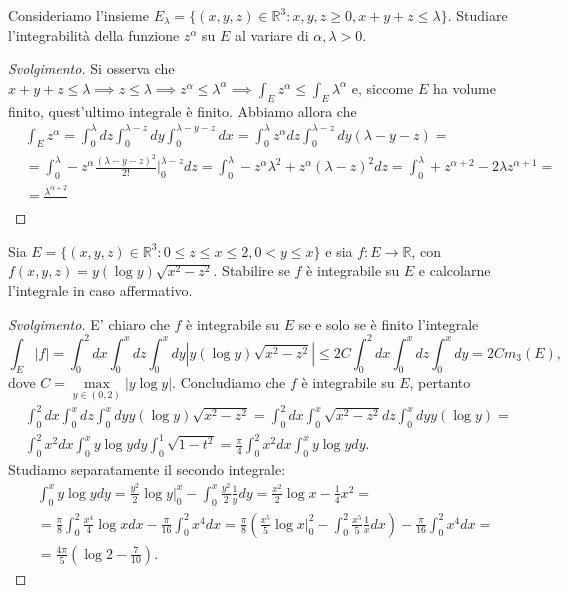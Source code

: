 \begin{exercise}
	Consideriamo l'insieme $E_\lambda = \{ (x, y, z) \in \mathbb{R}^3 : x, y, z \geq 0, x + y + z \leq \lambda \}$. Studiare l'integrabilità della funzione $z^{\alpha}$ su $E$ al variare di $\alpha, \lambda > 0$.
\end{exercise}
\begin{proof}[Svolgimento]
	Si osserva che $x + y + z \leq \lambda \implies z \leq \lambda \implies z^{\alpha} \leq \lambda^{\alpha} \implies \int_E z^{\alpha} \leq \int_E \lambda^{\alpha}$ e, siccome $E$ ha volume finito, quest'ultimo integrale è finito. Abbiamo allora che
	\begin{align*}
		&\int_E z^{\alpha} = \int_0^{\lambda} dz \int_0^{\lambda - z} dy \int_0^{\lambda - y - z} dx = \int_0^{\lambda} z^{\alpha} dz \int_0^{\lambda - z} dy (\lambda - y - z) = \\
		&=\int_0^{\lambda} - z^{\alpha}\frac{(\lambda - y - z)^2}{2!}|^{\lambda - z}_0 dz = \int_0^{\lambda} - z^{\alpha} \lambda^2 + z^{\alpha}(\lambda - z)^2 dz = \int_0^{\lambda} + z^{\alpha + 2} - 2\lambda z^{\alpha + 1} = \\
		&=\frac{\lambda^{\alpha + 2}}{}
	\end{align*}
\end{proof}
\begin{exercise}
	Sia $E = \{ (x, y, z) \in \mathbb{R}^3 : 0 \leq z \leq x \leq 2, 0 < y \leq x \}$ e sia $f: E \to \mathbb{R}$, con $f(x, y, z) = y(\log{y})\sqrt{x^2 - z^2}$. Stabilire se $f$ è integrabile su $E$ e calcolarne l'integrale in caso affermativo.
\end{exercise}
\begin{proof}[Svolgimento]
	E' chiaro che $f$ è integrabile su $E$ se e solo se è finito l'integrale
	$$
		\int_E |f| = \int_0^2 dx \int_0^x dz \int_0^x dy |y(\log{y})\sqrt{x^2 - z^2}| \leq 2C \int_0^2 dx \int_0^x dz \int_0^x dy = 2C m_3(E),
	$$
	dove $C = \max\limits_{y \in (0, 2)} |y\log{y}|$. Concludiamo che $f$ è integrabile su $E$, pertanto
	\begin{align*}
	&\int_0^2 dx \int_0^x dz \int_0^x dy y(\log{y}) \sqrt{x^2 - z^2} = \int_0^2 dx \int_0^x \sqrt{x^2 - z^2} dz \int_0^x dy y(\log{y}) = \\
	&\int_0^2 x^2 dx \int_0^x y\log{y} dy \int_0^1  \sqrt{1 - t^2} = \frac{\pi}{4} \int_0^2 x^2 dx \int_0^x y\log{y}dy. 
	\end{align*}
	Studiamo separatamente il secondo integrale:
	\begin{align*}
		&\int_0^x y\log{y}dy = \frac{y^2}{2} \log{y}|^x_0 - \int_0^x \frac{y^2}{2} \frac{1}{y}dy = \frac{x^2}{2} \log{x} - \frac{1}{4}x^2 = \\
		&=\frac{\pi}{8} \int_0^2 \frac{x^4}{4} \log{x} dx - \frac{\pi}{16} \int_0^2 x^4 dx = \frac{\pi}{8} \left(\frac{x^5}{5} \log{x}|^2_0 - \int_0^2 \frac{x^5}{5} \frac{1}{x} dx \right) - \frac{\pi}{16} \int_0^2 x^4 dx = \\
		&=\frac{4\pi}{5}(\log{2} - \frac{7}{10}).  
	\end{align*}
\end{proof}
